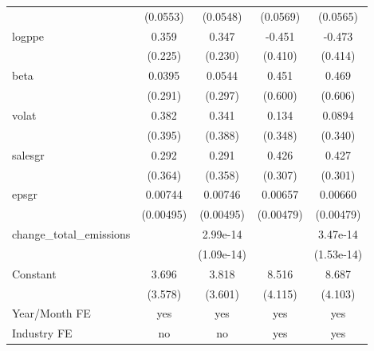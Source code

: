 \begin{table}[htbp]
\begin{tabular}{l*{4}{c}}
                    &    (0.0553)         &    (0.0548)         &    (0.0569)         &    (0.0565)         \\
[1em]
logppe              &       0.359         &       0.347         &      -0.451         &      -0.473         \\
                    &     (0.225)         &     (0.230)         &     (0.410)         &     (0.414)         \\
[1em]
beta                &      0.0395         &      0.0544         &       0.451         &       0.469         \\
                    &     (0.291)         &     (0.297)         &     (0.600)         &     (0.606)         \\
[1em]
volat               &       0.382         &       0.341         &       0.134         &      0.0894         \\
                    &     (0.395)         &     (0.388)         &     (0.348)         &     (0.340)         \\
[1em]
salesgr             &       0.292         &       0.291         &       0.426         &       0.427         \\
                    &     (0.364)         &     (0.358)         &     (0.307)         &     (0.301)         \\
[1em]
epsgr               &     0.00744         &     0.00746         &     0.00657         &     0.00660         \\
                    &   (0.00495)         &   (0.00495)         &   (0.00479)         &   (0.00479)         \\
[1em]
change\_total\_emissions&                     &    2.99e-14\sym{***}&                     &    3.47e-14\sym{**} \\
                    &                     &  (1.09e-14)         &                     &  (1.53e-14)         \\
[1em]
Constant            &       3.696         &       3.818         &       8.516\sym{**} &       8.687\sym{**} \\
                    &     (3.578)         &     (3.601)         &     (4.115)         &     (4.103)         \\
\hline
Year/Month FE       &         yes         &         yes         &         yes         &         yes         \\
Industry FE         &          no         &          no         &         yes         &         yes         \\

\end{tabular}
\end{table}
